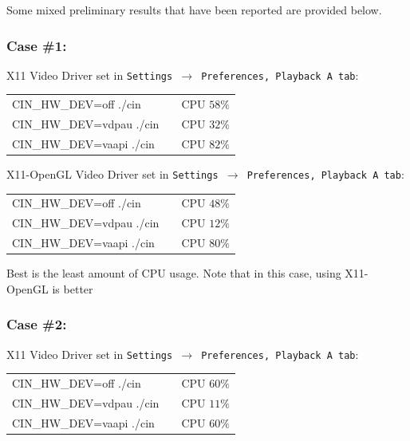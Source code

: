 Some mixed preliminary results that have been reported are provided below.

\subsubsection*{Case \#1:}%
\label{ssub:case_1}

\noindent X11 Video Driver set in \texttt{Settings $\rightarrow$ Preferences, Playback A tab}:

\begin{center}
	\begin{tabular}{lcr}
		CIN\_HW\_DEV=off ./cin & &CPU $58\%$ \\
		CIN\_HW\_DEV=vdpau ./cin & &CPU $32\%$ \\
		CIN\_HW\_DEV=vaapi ./cin & &CPU $82\%$ \\
	\end{tabular}
\end{center}

\noindent X11-OpenGL Video Driver set in \texttt{Settings $\rightarrow$ Preferences, Playback A tab}:

\begin{center}
	\begin{tabular}{lcr}
		CIN\_HW\_DEV=off ./cin & &CPU $48\%$ \\
		CIN\_HW\_DEV=vdpau ./cin & &CPU $12\%$ \\
		CIN\_HW\_DEV=vaapi ./cin & &CPU $80\%$ \\
	\end{tabular}
\end{center}

\noindent Best is the least amount of CPU usage. Note that in this case, using X11-OpenGL is better

\subsubsection*{Case \#2:}%
\label{ssub:case_2}

\noindent X11 Video Driver set in \texttt{Settings $\rightarrow$ Preferences, Playback A tab}:

\begin{center}
	\begin{tabular}{lcr}
		CIN\_HW\_DEV=off ./cin & &CPU $60\%$ \\
		CIN\_HW\_DEV=vdpau ./cin & &CPU $11\%$ \\
		CIN\_HW\_DEV=vaapi ./cin & &CPU $60\%$ \\
	\end{tabular}
\end{center}

